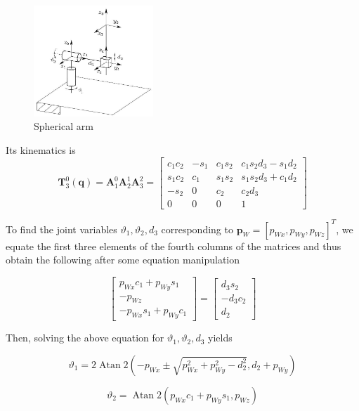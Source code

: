 \documentclass[10pt]{article}
\begin{document}
\begin{figure}[h]
    \centering
   \includegraphics[max width=0.4\textwidth]{./kinematics/spherical_arm}
    \caption{Spherical arm}
    \label{c1.l2.fig.spherical-arm}
\end{figure}

\noindent
Its  kinematics is
$$
\boldsymbol{T}_{3}^{0}(\boldsymbol{q})=\boldsymbol{A}_{1}^{0} \boldsymbol{A}_{2}^{1} \boldsymbol{A}_{3}^{2}=\left[\begin{array}{cccc}
c_{1} c_{2} & -s_{1} & c_{1} s_{2} & c_{1} s_{2} d_{3}-s_{1} d_{2} \\
s_{1} c_{2} & c_{1} & s_{1} s_{2} & s_{1} s_{2} d_{3}+c_{1} d_{2} \\
-s_{2} & 0 & c_{2} & c_{2} d_{3} \\
0 & 0 & 0 & 1
\end{array}\right]
$$


To find the joint variables $\vartheta_{1}, \vartheta_{2}, d_{3}$ corresponding to  $\boldsymbol{p}_{W}=[p_{Wx}, p_{Wy}, p_{Wz}]^T$, we equate the first three elements of the fourth columns of the matrices and thus obtain the following after some equation manipulation

$$
\left[\begin{array}{c}
p_{W x} c_{1}+p_{W y} s_{1} \\
-p_{W z} \\
-p_{W x} s_{1}+p_{W y} c_{1}
\end{array}\right]=\left[\begin{array}{c}
d_{3} s_{2} \\
-d_{3} c_{2} \\
d_{2}
\end{array}\right]
$$

\noindent
Then, solving the above equation for $\vartheta_{1}, \vartheta_{2}, d_{3}$ yields 

$$
\vartheta_{1}=2 \operatorname{Atan} 2\left(-p_{W x} \pm \sqrt{p_{W x}^{2}+p_{W y}^{2}-d_{2}^{2}}, d_{2}+p_{W y}\right)
$$


$$
\vartheta_{2}=\operatorname{Atan} 2\left(p_{W x} c_{1}+p_{W y} s_{1}, p_{W z}\right)
$$
\end{document}
